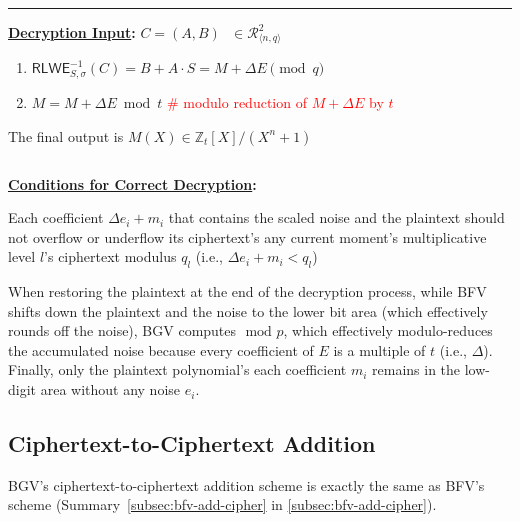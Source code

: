 \begin{tcolorbox}[title={\textbf{\tboxlabel{\ref*{subsec:bgv-enc-dec}} BGV Encryption and Decryption}}]
\par\noindent\rule{\textwidth}{0.4pt}

\textbf{\underline{Decryption Input}:} $C = (A, B) \text{ } \in \mathcal{R}_{\langle n,q \rangle}^2$

\begin{enumerate}
\item $\textsf{RLWE}^{-1}_{S,\sigma}(C) = B + A \cdot S  = M + \Delta E \pmod q$

\item $M = M + \Delta E \bmod t$ \textcolor{red}{ \# modulo reduction of $M + \Delta E$ by $t$}

\end{enumerate}

The final output is $M(X) \in \mathbb{Z}_t[X] / (X^n + 1)$

$ $

\textbf{\underline{Conditions for Correct Decryption}:}

Each coefficient $\Delta e_i + m_i$ that contains the scaled noise and the plaintext should not overflow or underflow its ciphertext's any current moment's multiplicative level $l$'s ciphertext modulus $q_l$ (i.e., $\Delta e_i + m_i < q_l$)

\end{tcolorbox}

When restoring the plaintext at the end of the decryption process, while BFV shifts down the plaintext and the noise to the lower bit area (which effectively rounds off the noise), BGV computes $\text{ mod } p$, which effectively modulo-reduces the accumulated noise because every coefficient of $E$ is a multiple of $t$ (i.e., $\Delta$). Finally, only the plaintext polynomial's each coefficient $m_i$ remains in the low-digit area without any noise $e_i$. 


\subsection{Ciphertext-to-Ciphertext Addition}
\label{subsec:bgv-add-cipher}

BGV's ciphertext-to-ciphertext addition scheme is exactly the same as BFV's scheme (Summary~\ref*{subsec:bfv-add-cipher} in \autoref{subsec:bfv-add-cipher}). 


